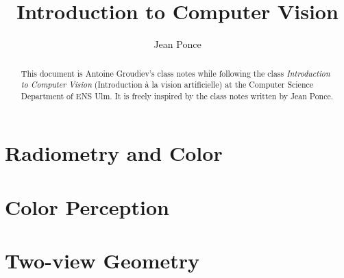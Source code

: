 \documentclass[toc, titlepaged]{../cs-classes/cs-classes}
\title{Introduction to Computer Vision}
\author{Jean Ponce}
\begin{document}
\begin{abstract}
    This document is Antoine Groudiev's class notes while following the class \emph{Introduction to Computer Vision} (Introduction à la vision artificielle) at the Computer Science Department of ENS Ulm. It is freely inspired by the class notes written by Jean Ponce.
\end{abstract}







\section{Radiometry and Color}
\section{Color Perception}
\section{Two-view Geometry}

\end{document}
